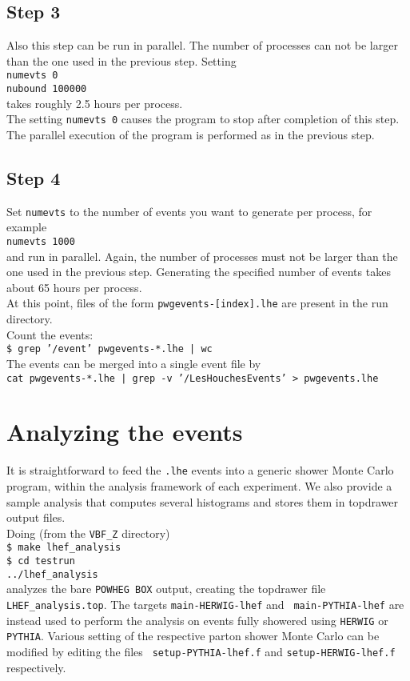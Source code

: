 \documentclass[a4paper,11pt]{article}
\begin{document}
\subsection*{Step 3}
%
Also this step can be run in parallel. The number of processes can 
not be larger than the one used in the previous step. Setting
\\[2ex]
{\tt numevts 0}
\\[2ex]
{\tt nubound 100000}
\\[2ex]
takes roughly 2.5 hours per process.
\\[2ex]
The setting {\tt numevts 0} causes the program to stop after
completion of this step.  The parallel execution of the program is
performed as in the previous step.

\subsection*{Step 4}
%
Set {\tt numevts} to the number of events you want to generate per
process, for example
\\[2ex]
{\tt numevts 1000}
\\[2ex]
and run in parallel. Again, the number of processes must not be larger than
the one used in the previous step. Generating the specified number of
events takes about 65 hours per process.
\\[2ex]
At this point, files of the form {\tt pwgevents-[index].lhe} are
present in the run directory.
\\[2ex]
Count the events:
\\[2ex]
{\tt \$ grep '/event' pwgevents-*.lhe | wc}
\\[2ex]
The events can be merged into a single event file by
\\[2ex]
{\tt cat pwgevents-*.lhe | grep -v '/LesHouchesEvents' >
  pwgevents.lhe}


\section*{Analyzing the events}
%
It is straightforward to feed the {\tt *.lhe} events into a generic
shower Monte Carlo program, within the analysis framework of each
experiment. We also provide a sample analysis that computes several
histograms and stores them in topdrawer output files.
\\[2ex]
Doing (from the {\tt VBF\_Z} directory)
\\[2ex]
{\tt \$ make lhef\_analysis}
\\[2ex]
{\tt \$ cd testrun}
\\[2ex]
{\tt ../lhef\_analysis}
\\[2ex]
analyzes the bare {\tt POWHEG BOX} output, creating the topdrawer file
{\tt LHEF\_analysis.top}. The targets {\tt main-HERWIG-lhef} and {\tt
  main-PYTHIA-lhef} are instead used to perform the analysis on events
fully showered using {\tt HERWIG} or {\tt PYTHIA}. Various setting of
the respective parton shower Monte Carlo can be modified by editing the files {\tt
  setup-PYTHIA-lhef.f} and {\tt setup-HERWIG-lhef.f} respectively.
\end{document}
